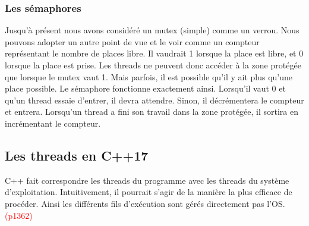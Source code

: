\documentclass[a4paper,twoside,10pt,english,french,twocolumn]{article}
\theoremstyle{definition}
\theoremstyle{remark}
\theoremstyle{plain}
\begin{document}
\subsubsection*{Les sémaphores}
Jusqu'à présent nous avons considéré un mutex (simple) comme un verrou. Nous pouvons adopter un autre point de vue et le voir comme un compteur représentant le nombre de places libre. Il vaudrait 1 lorsque la place est libre, et 0 lorsque la place est prise. Les threads ne peuvent donc accéder à la zone protégée que lorsque le mutex vaut 1. Mais parfois, il est possible qu'il y ait plus qu'une place possible. Le sémaphore fonctionne exactement ainsi. Lorsqu'il vaut 0 et qu'un thread essaie d'entrer, il devra attendre. Sinon, il décrémentera le compteur et entrera. Lorsqu'un thread a fini son travail dans la zone protégée, il sortira en incrémentant le compteur.

\subsection{Les threads en C++17}
C++ fait correspondre les threads du programme avec les threads du système d'exploitation. Intuitivement, il pourrait s'agir de la manière la plus efficace de procéder. Ainsi les différents fils d’exécution sont gérés directement pas l'OS. \textcolor{red}{(p1362)}\\
\end{document}

